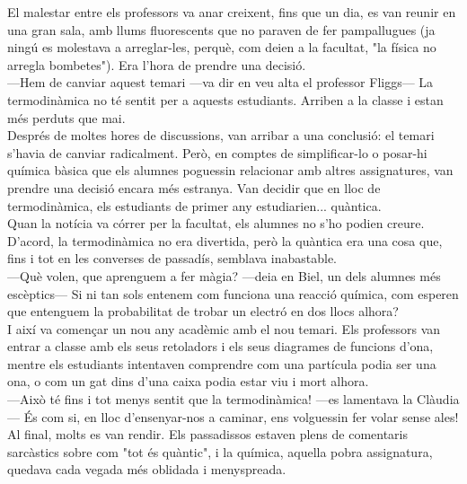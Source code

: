 El malestar entre els professors va anar creixent, fins que un dia, es van reunir en una gran sala, amb llums fluorescents que no paraven de fer pampallugues (ja ningú es molestava a arreglar-les, perquè, com deien a la facultat, "la física no arregla bombetes"). Era l'hora de prendre una decisió.\\

—Hem de canviar aquest temari —va dir en veu alta el professor Fliggs— La termodinàmica no té sentit per a aquests estudiants. Arriben a la classe i estan més perduts que mai.\\

Després de moltes hores de discussions, van arribar a una conclusió: el temari s'havia de canviar radicalment. Però, en comptes de simplificar-lo o posar-hi química bàsica que els alumnes poguessin relacionar amb altres assignatures, van prendre una decisió encara més estranya. Van decidir que en lloc de termodinàmica, els estudiants de primer any estudiarien... quàntica.\\

Quan la notícia va córrer per la facultat, els alumnes no s'ho podien creure. D'acord, la termodinàmica no era divertida, però la quàntica era una cosa que, fins i tot en les converses de passadís, semblava inabastable.\\

—Què volen, que aprenguem a fer màgia? —deia en Biel, un dels alumnes més escèptics— Si ni tan sols entenem com funciona una reacció química, com esperen que entenguem la probabilitat de trobar un electró en dos llocs alhora?\\

I així va començar un nou any acadèmic amb el nou temari. Els professors van entrar a classe amb els seus retoladors i els seus diagrames de funcions d'ona, mentre els estudiants intentaven comprendre com una partícula podia ser una ona, o com un gat dins d'una caixa podia estar viu i mort alhora.\\

—Això té fins i tot menys sentit que la termodinàmica! —es lamentava la Clàudia— És com si, en lloc d'ensenyar-nos a caminar, ens volguessin fer volar sense ales!\\

Al final, molts es van rendir. Els passadissos estaven plens de comentaris sarcàstics sobre com "tot és quàntic", i la química, aquella pobra assignatura, quedava cada vegada més oblidada i menyspreada.\\


